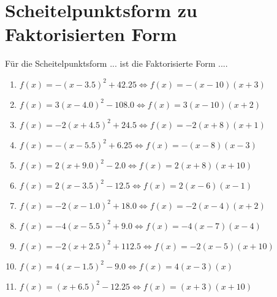 \documentclass{article}%
\begin{document}
\section{Scheitelpunktsform zu Faktorisierten Form}%
\label{sec:ScheitelpunktsformzuFaktorisiertenForm}%
Für die Scheitelpunktsform ... ist die Faktorisierte Form ....%
\begin{enumerate}[label=\alph*)]%
\item%
\newline\vspace{0.5cm}$f(x)=-(x-3.5)^2 +42.25\Leftrightarrow f(x)=-(x-10)(x+3)$%
\item%
\newline\vspace{0.5cm}$f(x)=3(x-4.0)^2 -108.0\Leftrightarrow f(x)=3(x-10)(x+2)$%
\item%
\newline\vspace{0.5cm}$f(x)=-2(x+4.5)^2 +24.5\Leftrightarrow f(x)=-2(x+8)(x+1)$%
\item%
\newline\vspace{0.5cm}$f(x)=-(x-5.5)^2 +6.25\Leftrightarrow f(x)=-(x-8)(x-3)$%
\item%
\newline\vspace{0.5cm}$f(x)=2(x+9.0)^2 -2.0\Leftrightarrow f(x)=2(x+8)(x+10)$%
\item%
\newline\vspace{0.5cm}$f(x)=2(x-3.5)^2 -12.5\Leftrightarrow f(x)=2(x-6)(x-1)$%
\item%
\newline\vspace{0.5cm}$f(x)=-2(x-1.0)^2 +18.0\Leftrightarrow f(x)=-2(x-4)(x+2)$%
\item%
\newline\vspace{0.5cm}$f(x)=-4(x-5.5)^2 +9.0\Leftrightarrow f(x)=-4(x-7)(x-4)$%
\item%
\newline\vspace{0.5cm}$f(x)=-2(x+2.5)^2 +112.5\Leftrightarrow f(x)=-2(x-5)(x+10)$%
\item%
\newline\vspace{0.5cm}$f(x)=4(x-1.5)^2 -9.0\Leftrightarrow f(x)=4(x-3)(x)$%
\item%
\newline\vspace{0.5cm}$f(x)=(x+6.5)^2 -12.25\Leftrightarrow f(x)=(x+3)(x+10)$%

\end{enumerate}
\end{document}
